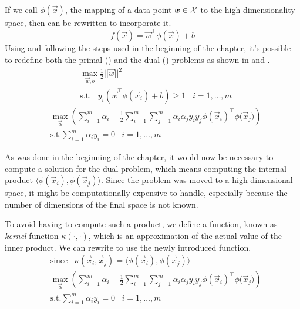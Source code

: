 If we call $\phi(\vec{x})$, the mapping of a data-point $\boldsymbol{x} \in \mathcal{X}$ to the high
dimensionality space, then  can be rewritten to incorporate it.
\begin{equation}
	\label{ep:hd-hyperplane}
	f(\vec{x}) = \vec{w}^\top \phi(\vec{x}) + b
\end{equation}
Using  and following the steps used in the beginning of the chapter,
it's possible to redefine both the primal () and the dual () problems
as shown in  and .
\begin{equation}
	\label{eq:hd-primal}
	\begin{aligned}
		 & \max_{\vec{w}, b}\frac{1}{2}||\vec{w}||^2                                                         \\
		 & \text{s.t.}\hspace{10pt}y_i(\vec{w}^\top\phi(\vec{x}_i) + b) \geq 1 \hspace{10pt}i = 1, \ldots, m
	\end{aligned}
\end{equation}
\begin{equation}
	\label{eq:hd-dual}
	\begin{aligned}
		 & \max_{\vec{\alpha}}\left(\sum_{i = 1}^{m}{\alpha_i} - \frac{1}{2}\sum_{i =
		1}^{m}\sum_{j = 1}^{m}{\alpha_i\alpha_j y_i y_j \phi(\vec{x}_i)^\top\phi(\vec{x}_j})\right) \\
		 & \text{s.t.} \sum_{i = 1}^{m}{\alpha_i y_i} = 0 \hspace{10pt} i = 1, \ldots, m
	\end{aligned}
\end{equation}

As was done in the beginning of the chapter, it would now be necessary to compute a solution for the
dual problem, which means computing the internal product $\langle\phi(\vec{x}_i),
\phi(\vec{x}_j)\rangle$. Since the problem was moved to a high dimensional space, it might be
computationally expensive to handle, especially because the number of dimensions of the final space
is not known.

To avoid having to compute such a product, we define a function, known as \emph{kernel} function
$\kappa(\cdot, \cdot)$,
which is an approximation of the actual value of the inner product. We can rewrite  to use the newly introduced function.
\begin{equation}
	\label{eq:hd-dual-kf}
	\begin{aligned}
		 & \text{since} \hspace{10pt} \kappa(\vec{x}_i, \vec{x}_j) = \langle\phi(\vec{x}_i),
		\phi(\vec{x}_j)\rangle                                                                      \\
		 & \max_{\vec{\alpha}}\left(\sum_{i = 1}^{m}{\alpha_i} - \frac{1}{2}\sum_{i =
		1}^{m}\sum_{j = 1}^{m}{\alpha_i\alpha_j y_i y_j \phi(\vec{x}_i)^\top\phi(\vec{x}_j})\right) \\
		 & \text{s.t.} \sum_{i = 1}^{m}{\alpha_i y_i} = 0 \hspace{10pt} i = 1, \ldots, m
	\end{aligned}
\end{equation}

